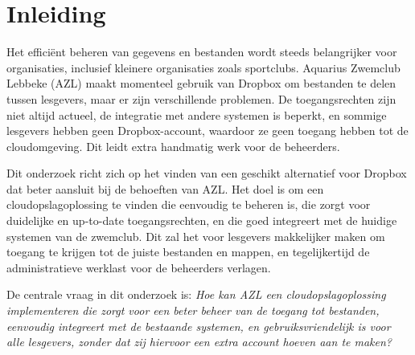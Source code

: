 


% 

\section{Inleiding}%
\label{sec:inleiding}

Het efficiënt beheren van gegevens en bestanden wordt steeds belangrijker voor organisaties, inclusief kleinere organisaties zoals sportclubs. Aquarius Zwemclub Lebbeke (AZL) maakt momenteel gebruik van Dropbox om bestanden te delen tussen lesgevers, maar er zijn verschillende problemen. De toegangsrechten zijn niet altijd actueel, de integratie met andere systemen is beperkt, en sommige lesgevers hebben geen Dropbox-account, waardoor ze geen toegang hebben tot de cloudomgeving. Dit leidt extra handmatig werk voor de beheerders.

Dit onderzoek richt zich op het vinden van een geschikt alternatief voor Dropbox dat beter aansluit bij de behoeften van AZL. Het doel is om een cloudopslagoplossing te vinden die eenvoudig te beheren is, die zorgt voor duidelijke en up-to-date toegangsrechten, en die goed integreert met de huidige systemen van de zwemclub. Dit zal het voor lesgevers makkelijker maken om toegang te krijgen tot de juiste bestanden en mappen, en tegelijkertijd de administratieve werklast voor de beheerders verlagen.

De centrale vraag in dit onderzoek is: \textit{Hoe kan AZL een cloudopslagoplossing implementeren die zorgt voor een beter beheer van de toegang tot bestanden, eenvoudig integreert met de bestaande systemen, en gebruiksvriendelijk is voor alle lesgevers, zonder dat zij hiervoor een extra account hoeven aan te maken?}

